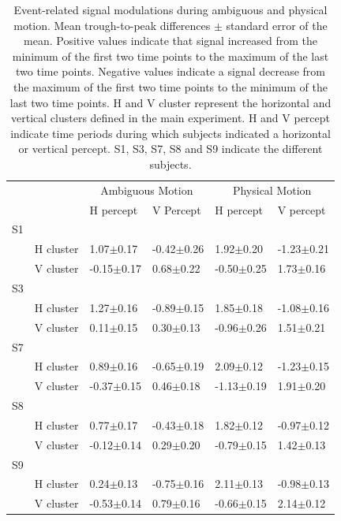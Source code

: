 \begin{table}[htbp!]
\centering
\caption{Event-related signal modulations during ambiguous and physical motion. Mean trough-to-peak differences $\pm$ standard error of the mean. Positive values indicate that signal increased from the minimum of the first two time points to the maximum of the last two time points. Negative values indicate a signal decrease from the maximum of the first two time points to the minimum of the last two time points. H and V cluster represent the horizontal and vertical clusters defined in the main experiment. H and V percept indicate time periods during which subjects indicated a horizontal or vertical percept. S1, S3, S7, S8 and S9 indicate the different subjects.}
\begin{tabular}{lrllll}
\\
\midrule
\multicolumn{2}{l}{} & \multicolumn{2}{c}{Ambiguous Motion} & \multicolumn{2}{c}{Physical Motion} \\
    &                & H percept      & V Percept      & H percept      & V percept \\
\hline
S1  &                &                &                &                &                \\
    & H cluster      &  1.07$\pm$0.17 & -0.42$\pm$0.26 &  1.92$\pm$0.20 & -1.23$\pm$0.21 \\
    & V cluster      & -0.15$\pm$0.17 &  0.68$\pm$0.22 & -0.50$\pm$0.25 &  1.73$\pm$0.16 \\
\hline
S3  &                &                &                &                &                \\
    & H cluster      & 1.27$\pm$0.16  & -0.89$\pm$0.15 &  1.85$\pm$0.18 & -1.08$\pm$0.16 \\
    & V cluster      & 0.11$\pm$0.15  &  0.30$\pm$0.13 & -0.96$\pm$0.26 &  1.51$\pm$0.21 \\
\hline
S7  &                &                &                &                &                \\
    & H cluster      &  0.89$\pm$0.16 & -0.65$\pm$0.19 &  2.09$\pm$0.12 & -1.23$\pm$0.15 \\
    & V cluster      & -0.37$\pm$0.15 &  0.46$\pm$0.18 & -1.13$\pm$0.19 &  1.91$\pm$0.20 \\
\hline
S8  &                &                &                &                &                \\
    & H cluster      &  0.77$\pm$0.17 & -0.43$\pm$0.18 &  1.82$\pm$0.12 & -0.97$\pm$0.12 \\
    & V cluster      & -0.12$\pm$0.14 &  0.29$\pm$0.20 & -0.79$\pm$0.15 &  1.42$\pm$0.13 \\
\hline
S9  &                &                &                &                &                \\
    & H cluster      &  0.24$\pm$0.13 & -0.75$\pm$0.16 &  2.11$\pm$0.13 & -0.98$\pm$0.13 \\
    & V cluster      & -0.53$\pm$0.14 &  0.79$\pm$0.16 & -0.66$\pm$0.15 &  2.14$\pm$0.12 \\
\bottomrule
\end{tabular}
\label{tab:modulations}
\end{table}

